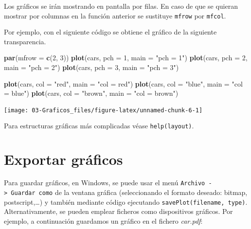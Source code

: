 \documentclass[]{book}
\newenvironment{Shaded}{\begin{snugshade}}{\end{snugshade}}
\newcommand{\DataTypeTok}[1]{\textcolor[rgb]{0.13,0.29,0.53}{#1}}
\newcommand{\DecValTok}[1]{\textcolor[rgb]{0.00,0.00,0.81}{#1}}
\newcommand{\KeywordTok}[1]{\textcolor[rgb]{0.13,0.29,0.53}{\textbf{#1}}}
\newcommand{\NormalTok}[1]{#1}
\newcommand{\StringTok}[1]{\textcolor[rgb]{0.31,0.60,0.02}{#1}}
\begin{document}
Los gráficos se irán mostrando en pantalla por filas. En caso de que se
quieran mostrar por columnas en la función anterior se sustituye \texttt{mfrow}
por \texttt{mfcol}.

Por ejemplo, con el siguiente código se obtiene el gráfico de la
siguiente transparencia.

\begin{Shaded}
\begin{Highlighting}[]
\KeywordTok{par}\NormalTok{(}\DataTypeTok{mfrow =} \KeywordTok{c}\NormalTok{(}\DecValTok{2}\NormalTok{, }\DecValTok{3}\NormalTok{))}
\KeywordTok{plot}\NormalTok{(cars, }\DataTypeTok{pch =} \DecValTok{1}\NormalTok{, }\DataTypeTok{main =} \StringTok{"pch = 1"}\NormalTok{)}
\KeywordTok{plot}\NormalTok{(cars, }\DataTypeTok{pch =} \DecValTok{2}\NormalTok{, }\DataTypeTok{main =} \StringTok{"pch = 2"}\NormalTok{)}
\KeywordTok{plot}\NormalTok{(cars, }\DataTypeTok{pch =} \DecValTok{3}\NormalTok{, }\DataTypeTok{main =} \StringTok{"pch = 3"}\NormalTok{)}

\KeywordTok{plot}\NormalTok{(cars, }\DataTypeTok{col =} \StringTok{"red"}\NormalTok{, }\DataTypeTok{main =} \StringTok{"col = red"}\NormalTok{)}
\KeywordTok{plot}\NormalTok{(cars, }\DataTypeTok{col =} \StringTok{"blue"}\NormalTok{, }\DataTypeTok{main =} \StringTok{"col = blue"}\NormalTok{)}
\KeywordTok{plot}\NormalTok{(cars, }\DataTypeTok{col =} \StringTok{"brown"}\NormalTok{, }\DataTypeTok{main =} \StringTok{"col = brown"}\NormalTok{)}
\end{Highlighting}
\end{Shaded}

\begin{center}\texttt{[image: 03-Graficos\_files/figure-latex/unnamed-chunk-6-1]} \end{center}

Para estructuras gráficas más complicadas véase \texttt{help(layout)}.

\hypertarget{exportar-graficos}{%
\section{Exportar gráficos}\label{exportar-graficos}}

Para guardar gráficos, en
Windows, se puede usar el menú \texttt{Archivo\ -\textgreater{}\ Guardar\ como} de la ventana gráfica (seleccionando el formato deseado: bitmap, postscript,\ldots{}) y también
mediante código ejecutando \texttt{savePlot(filename,\ type)}.
Alternativamente, se pueden emplear ficheros como dispositivos gráficos. Por ejemplo, a continuación guardamos un gráfico en el fichero \emph{car.pdf}:
\end{document}
